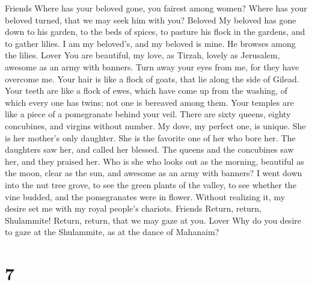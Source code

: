 Friends  Where has your beloved gone, you fairest among
women? Where has your beloved turned, that we may seek him with you?
Beloved  My beloved has gone down to his garden, to the
beds of spices, to pasture his flock in the gardens, and to gather
lilies.  I am my beloved's, and my beloved is mine. He
browses among the lilies. Lover  You are beautiful, my
love, as Tirzah, lovely as Jerusalem, awesome as an army with banners.
 Turn away your eyes from me, for they have overcome me.
Your hair is like a flock of goats, that lie along the side of Gilead.
 Your teeth are like a flock of ewes, which have come up
from the washing, of which every one has twins; not one is bereaved
among them.  Your temples are like a piece of a
pomegranate behind your veil.  There are sixty queens,
eighty concubines, and virgins without number.  My dove,
my perfect one, is unique. She is her mother's only daughter. She is the
favorite one of her who bore her. The daughters saw her, and called her
blessed. The queens and the concubines saw her, and they praised her.
 Who is she who looks out as the morning, beautiful as
the moon, clear as the sun, and awesome as an army with banners?
 I went down into the nut tree grove, to see the green
plants of the valley, to see whether the vine budded, and the
pomegranates were in flower.  Without realizing it, my
desire set me with my royal people's chariots. Friends 
Return, return, Shulammite! Return, return, that we may gaze at you.
Lover Why do you desire to gaze at the Shulammite, as at the dance of
Mahanaim?

\hypertarget{section-6}{%
\section{7}\label{section-6}}

